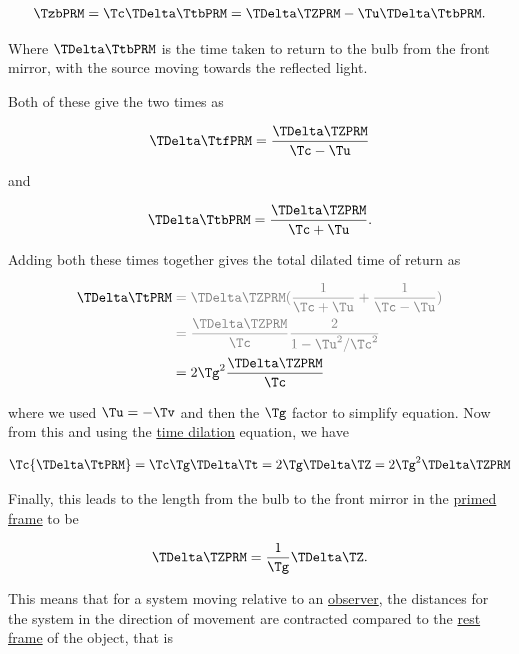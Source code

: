 \begin{equation}
	{\TzbPRM } = {\Tc } {\TDelta  \TtbPRM } = {\TDelta   \TZPRM } - {\Tu } {\TDelta  \TtbPRM }.
\end{equation}

Where ${\TDelta  \TtbPRM }$ is the time taken to return to the bulb from the front mirror, with the source moving towards the reflected light.

Both of these give the two times as

\begin{equation}
	{\TDelta  \TtfPRM } = \frac{\TDelta   \TZPRM }{ \Tc  - \Tu  }
\end{equation}

and

\begin{equation}
	{\TDelta  \TtbPRM } = \frac{ \TDelta   \TZPRM  }{ \Tc  + \Tu  }.
\end{equation}

Adding both these times together gives the total dilated time of return as

\begin{equation}
	\begin{aligned}
		{\TDelta  \TtPRM  } & \color{gray} = {\TDelta   \TZPRM }(\frac{1}{ \Tc  + \Tu  } + \frac{1}{ \Tc  - \Tu  }) \\
		              & \color{gray} = \frac{\TDelta   \TZPRM }{\Tc }\frac{2}{1- \Tu ^2/\Tc ^2}            \\
		              & =  2 \Tg ^2 \frac{\TDelta   \TZPRM }{\Tc }
	\end{aligned}
\end{equation}

where we used ${\Tu }=-{\Tv }$ and then the ${\Tg }$ factor to simplify equation.
Now from this and using the \hyperlink{def-time-dilation}{time dilation} equation, we have

\begin{equation}
	\Tc {\TDelta  \TtPRM  } = {\Tc }{\Tg } {\TDelta  \Tt } = 2{\Tg } {\TDelta  \TZ } = 2{\Tg }^2 {\TDelta   \TZPRM }
\end{equation}

Finally, this leads to the length from the bulb to the front mirror in the \hyperlink{def-Primed-Frame}{primed frame} to be

\begin{equation}
	{\TDelta   \TZPRM } = \frac{1}{ \Tg  }{\TDelta   \TZ }.
\end{equation}

This means that for a system moving relative to an \hyperlink{def-observer}{observer}, the distances for the system in the direction of movement are contracted compared to the \hyperlink{def-proper-frame}{rest frame} of the object, that is

